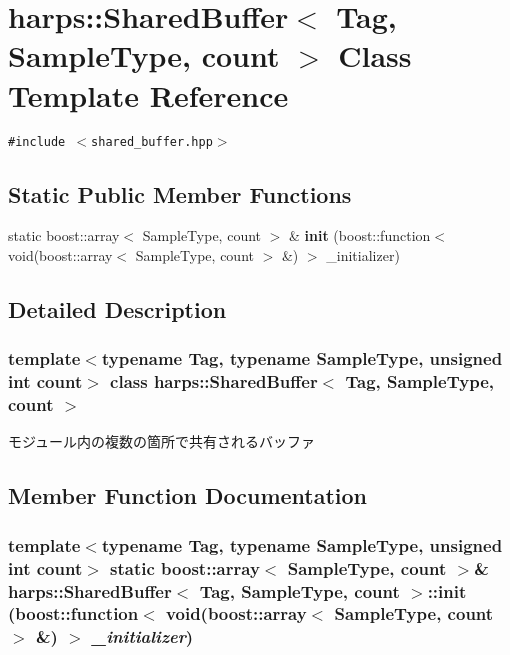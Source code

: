 \section{harps::SharedBuffer$<$ Tag, SampleType, count $>$ Class Template Reference}
\label{classharps_1_1SharedBuffer}
{\tt \#include $<$shared\_\-buffer.hpp$>$}

\subsection*{Static Public Member Functions}
\begin{CompactItemize}
\item 
static boost::array$<$ SampleType, count $>$ \& {\bf init} (boost::function$<$ void(boost::array$<$ SampleType, count $>$ \&) $>$ \_\-initializer)
\end{CompactItemize}


\subsection{Detailed Description}
\subsubsection*{template$<$typename Tag, typename SampleType, unsigned int count$>$ class harps::SharedBuffer$<$ Tag, SampleType, count $>$}

モジュール内の複数の箇所で共有されるバッファ 

\subsection{Member Function Documentation}
\subsubsection[init]{\setlength{\rightskip}{0pt plus 5cm}template$<$typename Tag, typename SampleType, unsigned int count$>$ static boost::array$<$ SampleType, count $>$\& {\bf harps::SharedBuffer}$<$ Tag, SampleType, count $>$::init (boost::function$<$ void(boost::array$<$ SampleType, count $>$ \&) $>$ {\em \_\-initializer})\hspace{0.3cm}{\tt  [inline, static]}}\label{classharps_1_1SharedBuffer_ca645777b94d527a7e340aba24b2c104}


